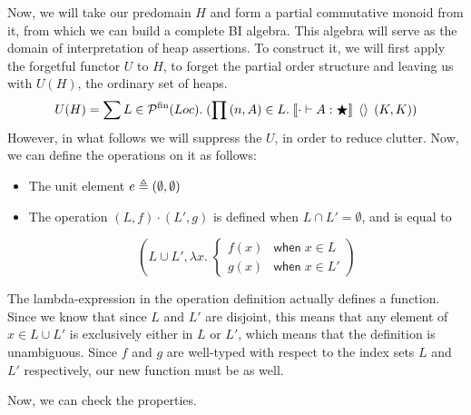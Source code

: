 Now, we will take our predomain $H$ and form a partial commutative
monoid from it, from which we can build a complete BI algebra. This
algebra will serve as the domain of interpretation of heap
assertions. To construct it, we will first apply the forgetful functor
$U$ to $H$, to forget the partial order structure and leaving us with
$U(H)$, the ordinary set of heaps.
\begin{displaymath}
U(H) = \sum L \in \powersetfin{Loc}.\; (\prod \sempair{n}{A} \in L.\;
\interp{\judgeWK[\cdot]{A}{\bigstar}}\;\left<\right>\;(K,K))
\end{displaymath}
However, in what follows we will suppress the $U$, in order to reduce
clutter. Now, we can define the operations on it as follows:

\begin{itemize}
\item The unit element $e \triangleq \sempair{\emptyset}{\emptyset}$
\item The operation $(L, f) \cdot (L', g)$ is defined when $L \cap L' = \emptyset$, and
      is equal to 

\begin{displaymath}
 \left(L \cup L', \lambda x.\;\left\{\begin{array}{ll}
                                 f(x) & \mathsf{when}\; x \in L \\
                                 g(x) & \mathsf{when}\; x \in L'
                               \end{array}
                         \right.\right)
 \end{displaymath}
\end{itemize}

The lambda-expression in the operation definition actually defines a
function. Since we know that since $L$ and $L'$ are disjoint, this
means that any element of $x \in L \cup L'$ is exclusively either in
$L$ or $L'$, which means that the definition is unambiguous. Since $f$
and $g$ are well-typed with respect to the index sets $L$ and $L'$
respectively, our new function must be as well.

Now, we can check the properties. 

